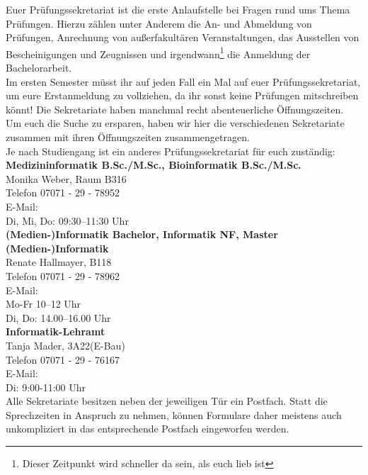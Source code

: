 Euer Prüfungssekretariat ist die erste Anlaufstelle bei Fragen rund ums Thema Prüfungen. Hierzu zählen unter Anderem die An- und Abmeldung von Prüfungen, Anrechnung von außerfakultären Veranstaltungen,
das Ausstellen von Bescheinigungen und Zeugnissen und irgendwann\footnote{Dieser Zeitpunkt wird schneller da sein, als euch lieb ist} die Anmeldung der Bachelorarbeit.\\
Im ersten Semester müsst ihr auf jeden Fall ein Mal auf euer Prüfungssekretariat, um eure Erstanmeldung zu vollziehen, da ihr sonst keine Prüfungen mitschreiben könnt! %
Die Sekretariate haben manchmal recht abenteuerliche Öffnungszeiten. Um euch die Suche zu ersparen, haben wir hier die verschiedenen Sekretariate zusammen mit ihren Öffnungszeiten zusammengetragen.\\
Je nach Studiengang ist ein anderes Prüfungssekretariat für euch zuständig: \\


\textbf{Medizininformatik B.Sc./M.Sc., Bioinformatik B.Sc./M.Sc.}\\ Monika Weber, Raum B316\\
Telefon 07071 - 29 - 78952\\
E-Mail: \\
Di, Mi, Do: 09:30–11:30 Uhr\\

\textbf{(Medien-)Informatik Bachelor, Informatik NF, Master (Medien-)Informatik}\\
Renate Hallmayer, B118\\
Telefon 07071 - 29 - 78962\\
E-Mail: \\
Mo-Fr 10–12 Uhr\\
Di, Do: 14.00–16.00 Uhr\\

\textbf{Informatik-Lehramt}\\
Tanja Mader, 3A22(E-Bau)\\
Telefon 07071 - 29 - 76167\\
E-Mail: \\
Di: 9:00-11:00 Uhr\\

Alle Sekretariate besitzen neben der jeweiligen Tür ein Postfach. Statt die Sprechzeiten in Anspruch zu nehmen, können Formulare daher meistens auch unkompliziert in das entsprechende Postfach eingeworfen werden.\\
